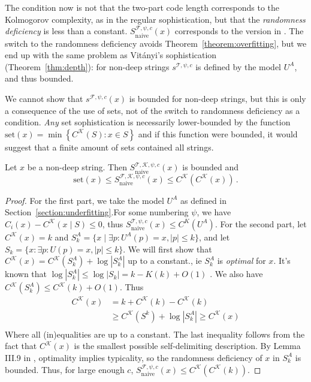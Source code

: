 \documentclass{style/llncs}
\newcommand{\T}{\mathscr T}
\newcommand{\F}{\mathscr F}
\newcommand{\K}{\mathscr K}
\newcommand{\s}{S}
\newcommand{\p}{\,\text{.}}
\begin{document}
The condition now is not that the two-part code length corresponds to the Kolmogorov complexity, as in the regular sophistication, but that the \emph{randomness deficiency} is less than a constant. $\s_\text{naive}^{\F,\psi,c}(x)$ corresponds to the version in \cite{mota2013sophistication}. The switch to the randomness deficiency avoids Theorem~\ref{theorem:overfitting}, but we end up with the same problem as Vit\'anyi's sophistication (Theorem~\ref{thm:depth}): for non-deep strings $s^{\T, \psi, c}$ is defined by the model $U^A$, and thus bounded.

We cannot show that $s^{\F, \psi, c}(x)$ is bounded for non-deep strings, but this is only a consequence of the use of sets, not of the switch to randomness deficiency as a condition. \emph{Any} set sophistication is necessarily lower-bounded by the function $\text{set}(x) = \min\left\{C^\K(S) : x \in S\right\}$ and if this function were bounded, it would suggest that a finite amount of sets contained all strings.
\begin{theorem}
Let $x$ be a non-deep string. Then $\s_\text{naive}^{\T,\K,\psi,c}(x)$ is bounded and
\[
\text{set}(x) \leq \s_\text{naive}^{\F,\K,\psi,c}(x) \leq C^\K(C^\K(x)) \p
\]\label{theorem:naive}
\end{theorem}
\begin{proof}
For the first part, we take the model $U^A$ as defined in Section~\ref{section:underfitting}.For some numbering $\psi$, we have $C_i(x) - C^\K(x\mid S) \leq 0$, thus $\s_\text{naive}^{\T,\psi,c}(x) \leq C^K(U^A)$. 
For the second part, let $C^\K(x) = k$ and $S^A_k = \{x \mid \exists p : U^A(p) = x, |p| \leq k\}$, and let $S_k = \{x : \exists p : U(p) = x, |p| \leq k\}$. We will first show that $C^\K(x) = C^\K(S_k^A) + \log |S_k^A|$ up to a constant., ie $S^A_k$ is \emph{optimal} for $x$. It's known that  $\log |S^A_k| \leq \log |S_k| = k - K(k) + O(1)$ \cite{gacs2001algorithmic}. We also have $C^\K(S_k^A) \leq C^\K(k) + O(1)$. Thus
\begin{align*} 
C^\K(x) &= k + C^\K(k) -C^\K(k) \\
&\geq C^\K(S^k) + \log |S^A_k| \geq C^\K(x) \\  
\end{align*}
Where all (in)equalities are up to a constant. The last inequality follows from the fact that $C^\K(x)$ is the smallest possible self-delimiting description. By Lemma III.9 in \cite{gacs2001algorithmic}, optimality implies typicality, so the randomness deficiency of $x$ in $S_k^A$ is bounded. Thus, for large enough $c$, $\s_\text{naive}^{\F,\psi,c}(x) \leq C^\K(C^\K(k))$.
\end{proof}
\end{document}
